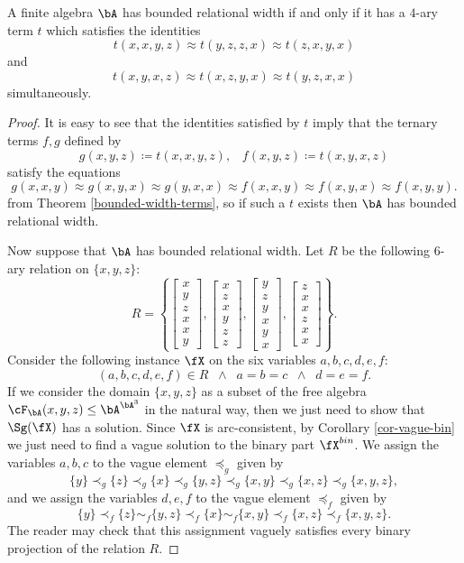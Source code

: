 \begin{prop} A finite algebra $\bA$ has bounded relational width if and only if it has a $4$-ary term $t$ which satisfies the identities
\[
t(x,x,y,z) \approx t(y,z,z,x) \approx t(z,x,y,x)
\]
and
\[
t(x,y,x,z) \approx t(x,z,y,x) \approx t(y,z,x,x)
\]
simultaneously.
\end{prop}
\begin{proof} It is easy to see that the identities satisfied by $t$ imply that the ternary terms $f, g$ defined by
\[
g(x,y,z) \coloneqq t(x,x,y,z), \;\;\; f(x,y,z) \coloneqq t(x,y,x,z)
\]
satisfy the equations
\[
g(x,x,y) \approx g(x,y,x) \approx g(y,x,x) \approx f(x,x,y) \approx f(x,y,x) \approx f(x,y,y).
\]
from Theorem \ref{bounded-width-terms}, so if such a $t$ exists then $\bA$ has bounded relational width.

Now suppose that $\bA$ has bounded relational width. Let $R$ be the following $6$-ary relation on $\{x,y,z\}$:
\[
R = \left\{\begin{bmatrix}x\\y\\z\\x\\x\\y\end{bmatrix},\begin{bmatrix}x\\z\\x\\y\\z\\z\end{bmatrix},\begin{bmatrix}y\\z\\y\\x\\y\\x\end{bmatrix},\begin{bmatrix}z\\x\\x\\z\\x\\x\end{bmatrix}\right\}.
\]
Consider the following instance $\fX$ on the six variables $a,b,c,d,e,f$:
\[
(a,b,c,d,e,f) \in R \;\; \wedge \;\; a = b = c \;\; \wedge \;\; d = e = f.
\]
If we consider the domain $\{x,y,z\}$ as a subset of the free algebra $\cF_\bA(x,y,z) \le \bA^{\bA^3}$ in the natural way, then we just need to show that $\Sg(\fX)$ has a solution. Since $\fX$ is arc-consistent, by Corollary \ref{cor-vague-bin} we just need to find a vague solution to the binary part $\fX^{bin}$. We assign the variables $a,b,c$ to the vague element $\preceq_g$ given by
\[
\{y\} \prec_g \{z\} \prec_g \{x\} \prec_g \{y,z\} \prec_g \{x,y\} \prec_g \{x,z\} \prec_g \{x,y,z\},
\]
and we assign the variables $d,e,f$ to the vague element $\preceq_f$ given by
\[
\{y\} \prec_f \{z\} \sim_f \{y,z\} \prec_f \{x\} \sim_f \{x,y\} \prec_f \{x,z\} \prec_f \{x,y,z\}.
\]
The reader may check that this assignment vaguely satisfies every binary projection of the relation $R$.
\end{proof}

